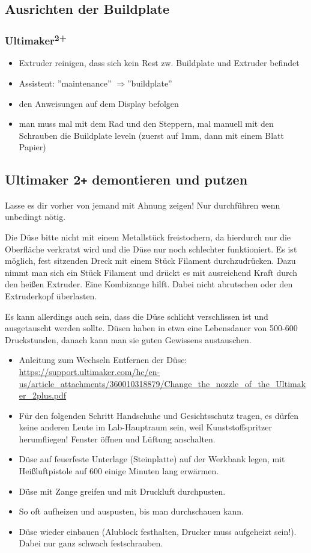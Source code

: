 \documentclass{\basedir/fablab-document}
\newcommand{\ts}[1]{\textsuperscript{#1}}
\newcommand{\ra}{$\Rightarrow$}
\begin{document}
\subsection{Ausrichten der Buildplate}

\subsubsection{Ultimaker\ts{2+}}
\begin{itemize}
\item Extruder reinigen, dass sich kein Rest zw. Buildplate und Extruder befindet
\item Assistent: ''maintenance'' \ra ''buildplate''
\item den Anweisungen auf dem Display befolgen
\item man muss mal mit dem Rad und den Steppern, mal manuell mit den Schrauben die Buildplate leveln (zuerst auf 1mm, dann mit einem Blatt Papier)
\end{itemize}


\subsection{Ultimaker 2\texttt{+} demontieren und putzen}
Lasse es dir vorher von jemand mit Ahnung zeigen! Nur durchführen wenn unbedingt nötig.

Die Düse bitte nicht mit einem Metallstück freistochern, da hierdurch nur die Oberfläche verkratzt wird und die Düse nur noch schlechter funktioniert. Es ist möglich, fest sitzenden Dreck mit einem Stück Filament durchzudrücken. Dazu nimmt man sich ein Stück Filament und drückt es mit ausreichend Kraft durch den heißen Extruder. Eine Kombizange hilft. Dabei nicht abrutschen oder den Extruderkopf überlasten.

Es kann allerdings auch sein, dass die Düse schlicht verschlissen ist und ausgetauscht werden sollte. Düsen haben in etwa eine Lebensdauer von 500-600 Druckstunden, danach kann man sie guten Gewissens austauschen.

\begin{itemize}
 \item Anleitung zum Wechseln Entfernen der Düse:\\
 \url{https://support.ultimaker.com/hc/en-us/article_attachments/360010318879/Change_the_nozzle_of_the_Ultimaker_2plus.pdf}
 \item Für den folgenden Schritt Handschuhe und Gesichtsschutz tragen, es dürfen keine anderen Leute im Lab-Hauptraum sein, weil Kunststoffspritzer herumfliegen! Fenster öffnen und Lüftung anschalten.
 \item Düse auf feuerfeste Unterlage (Steinplatte) auf der Werkbank legen, mit Heißluftpistole auf 600\textcelsius{} einige Minuten lang erwärmen.
 \item Düse mit Zange greifen und mit Druckluft durchpusten.
 \item So oft aufheizen und auspusten, bis man durchschauen kann.
 \item Düse wieder einbauen (Alublock festhalten, Drucker muss aufgeheizt sein!). Dabei nur ganz schwach festschrauben.
\end{itemize}
\end{document}
